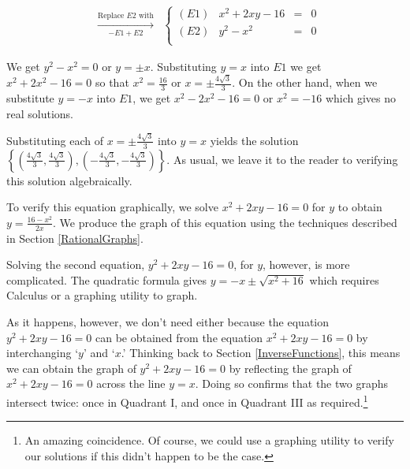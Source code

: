 \documentclass{ximera}
\begin{document}
\begin{example}
\begin{explanation}
\begin{enumerate}
\[\begin{array}{ccc}
&

\xrightarrow[\text{$-E1 + E2$}]{\text{Replace $E2$ with}}


&

\left\{\begin{array}{lrcr} (E1) &  x^2 +2xy -16 & = & 0 \\ (E2) & y^2 - x^2 & = & 0 \\ \end{array} \right.

\end{array} \]

We get $y^2 - x^2 = 0$ or $y = \pm x$.   Substituting $y=x$  into $E1$ we get $x^2+2x^2-16 = 0$ so that $x^2 = \frac{16}{3}$ or $x = \pm \frac{4 \sqrt{3}}{3}$.  On the other hand, when we substitute $y = -x$ into $E1$, we get $x^2 - 2x^2 - 16 = 0$ or $x^2 = -16$ which gives no real solutions.  

Substituting each of $x = \pm \frac{4 \sqrt{3}}{3}$ into $y=x$ yields the solution $\left\{\left(\frac{4 \sqrt{3}}{3},\frac{4 \sqrt{3}}{3}\right), \left(-\frac{4 \sqrt{3}}{3},-\frac{4 \sqrt{3}}{3}\right)\right\}$.  As usual, we leave it to the reader to verifying this solution algebraically.


To verify this equation graphically,  we solve $x^2 +2xy -16 = 0$ for $y$ to obtain $y = \frac{16 - x^2}{2x}$.  We produce the graph of this equation using the techniques described in  Section \ref{RationalGraphs}.  

Solving the second equation, $y^2 +2xy -16 = 0$, for $y$, however, is more complicated.  The quadratic formula  gives $y = -x \pm \sqrt{x^2+16}$ which requires Calculus or a graphing utility to graph.

As it happens, however, we don't need either because the equation $y^2+2xy-16 = 0$ can be obtained from the equation $x^2+2xy-16=0$ by interchanging `$y$' and `$x$.'  Thinking back to Section \ref{InverseFunctions}, this means we can obtain the graph of  $y^2+2xy-16 = 0$ by reflecting the graph of  $x^2+2xy-16 = 0$ across the line $y=x$.  Doing so confirms that the two graphs intersect twice: once in Quadrant I, and once in Quadrant III as required.\footnote{An amazing coincidence.  Of course, we could use a graphing utility to verify our solutions if this didn't happen to be the case.}

\begin{center}
\end{center}


\end{enumerate}
\end{explanation}
\end{example}
\end{document}
